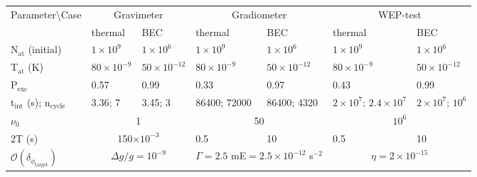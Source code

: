 %
%
%
\begin{tabular}[]{@{}l|ll|ll|ll@{}}
\toprule
\multicolumn{1}{c|}{\multirow{2}{*}{Parameter\textbackslash{}Case}} & \multicolumn{2}{c|}{Gravimeter}             & \multicolumn{2}{c|}{Gradiometer}                                   & \multicolumn{2}{c}{WEP-test}                              \\ \cmidrule(l){2-7} 
\multicolumn{1}{c|}{}                                               & thermal              & BEC                  & thermal                          & BEC                             & thermal                          & BEC                    \\ \midrule
N$_\text{at}$ (initial)                                             & $1\times 10^9$       & $1\times 10^6$       & $1\times 10^9$                   & $1\times 10^6$                  & $1\times 10^9$                   & $1\times 10^6$         \\
T$_\text{at}$ (K)                                                   & $80\times 10^{-9}$   & $50\times 10^{-12}$  & $80\times 10^{-9}$               & $50\times 10^{-12}$             & $80\times 10^{-9}$               & $50\times 10^{-12}$    \\
P$_\text{exc}$                                                      & 0.57                 & 0.99                 & 0.33                             & 0.97                            & 0.43                             & 0.99                   \\ \midrule
t$_\text{int}$ (s); n$_\text{cycle}$                                & 3.36; 7              & 3.45; 3              & 86400; 72000                     & 86400; 4320                     & $2\times 10^7$; $2.4\times 10^7$ & $2\times 10^7$; $10^6$ \\
$\nu_0$                                                             & \multicolumn{2}{c|}{1}                      & \multicolumn{2}{c|}{50}                                            & \multicolumn{2}{c}{$10^6$}                                \\
2T (s)                                                              & \multicolumn{2}{c|}{150$\times 10^{-3}$}    & 0.5                              & 10                              & 0.5                              & 10                     \\
$\mathcal{O}(\delta_{\phi_\text{target}})$                          & \multicolumn{2}{c|}{$\Delta g/g=10^{-9}$}   & \multicolumn{2}{c|}{$\Gamma=2.5$ mE$=2.5\times 10^{-12}$ s$^{-2}$} & \multicolumn{2}{c}{$\eta=2\times 10^{-15}$}               \\

\end{tabular}

